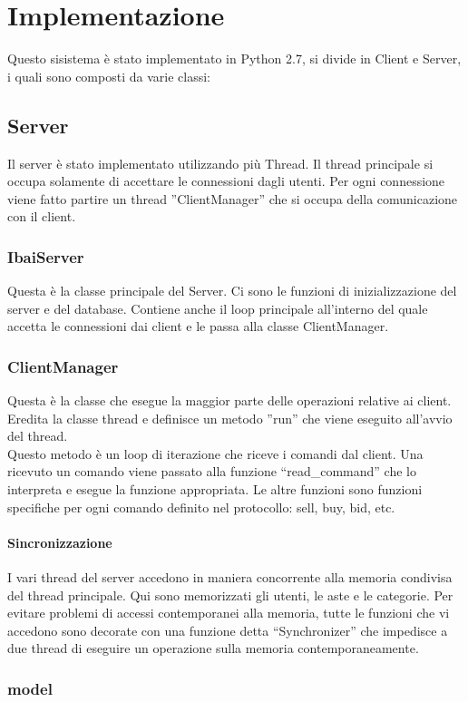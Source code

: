 \section{Implementazione}
Questo sisistema è stato implementato in Python 2.7, si divide in Client e Server, i quali sono composti da varie classi:
\subsection{Server}
Il server è stato implementato utilizzando più Thread. Il thread principale si occupa solamente di accettare le connessioni dagli utenti. Per ogni connessione viene fatto partire un thread ''ClientManager'' che si occupa della comunicazione con il client.
\subsubsection{IbaiServer}
Questa è la classe principale del Server. Ci sono le funzioni di inizializzazione del server e del database.
Contiene anche il loop principale all'interno del quale accetta le connessioni dai client e le passa alla classe ClientManager.
\subsubsection{ClientManager}
Questa è la classe che esegue la maggior parte delle operazioni relative ai client. Eredita la classe thread e definisce un metodo ''run'' che viene  eseguito all'avvio del thread.\\
Questo metodo è un loop di iterazione che riceve i comandi dal client. Una ricevuto un comando viene passato alla funzione “read\_command” che lo interpreta e esegue la funzione appropriata. Le altre funzioni sono funzioni specifiche per ogni comando definito nel protocollo: sell, buy, bid, etc.

\paragraph{Sincronizzazione}
I vari thread del server accedono in maniera concorrente alla memoria condivisa del thread principale. Qui sono memorizzati gli utenti, le aste e le categorie. Per evitare problemi di accessi contemporanei alla memoria, tutte le funzioni che vi accedono sono decorate con una funzione detta ``Synchronizer'' che impedisce a due thread di eseguire un operazione sulla memoria contemporaneamente.

\subsubsection{model}
